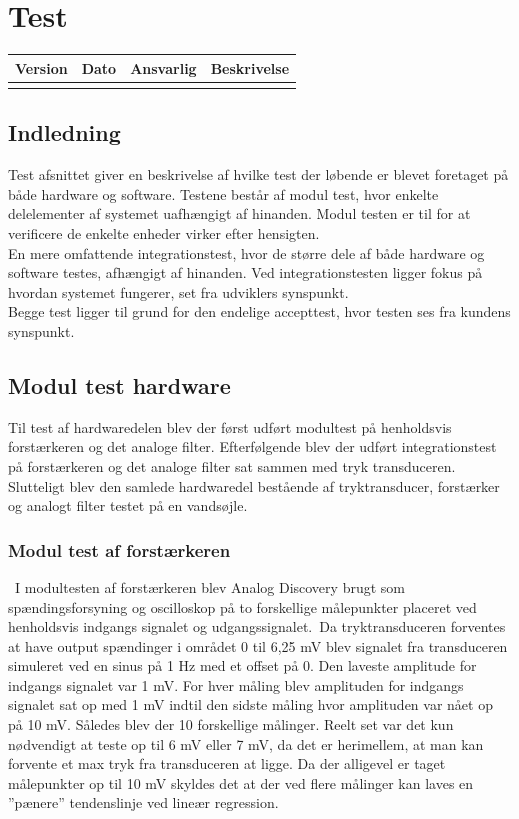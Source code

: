 \chapter{Test}\label{Test}
\setcounter{secnumdepth}{5}

\begin{longtabu} to 
    Version &    Dato &    Ansvarlig &    Beskrivelse\\[-1ex]
    \midrule
\label{version_Systemark}
\end{longtabu}

\section{Indledning}
Test afsnittet giver en beskrivelse af hvilke test der løbende er blevet foretaget på både hardware og software. Testene består af modul test, hvor enkelte delelementer af systemet uafhængigt af hinanden. Modul testen er til for at verificere de enkelte enheder virker efter hensigten.\\
En mere omfattende integrationstest, hvor de større dele af både hardware og software testes, afhængigt af hinanden. Ved integrationstesten ligger fokus på hvordan systemet fungerer, set fra udviklers synspunkt.\\ Begge test ligger til grund for den endelige accepttest, hvor testen ses fra kundens synspunkt.

\section{Modul test hardware}

Til test af hardwaredelen blev der først udført modultest på henholdsvis forstærkeren og det analoge filter. Efterfølgende blev der udført integrationstest på forstærkeren og det analoge filter sat sammen med tryk transduceren. Slutteligt blev den samlede hardwaredel bestående af tryktransducer, forstærker og analogt filter testet på en vandsøjle.\
\subsection{Modul test af forstærkeren}\
I modultesten af forstærkeren blev Analog Discovery brugt som spændingsforsyning og oscilloskop på to forskellige målepunkter placeret ved henholdsvis indgangs signalet og udgangssignalet.\
Da tryktransduceren forventes at have output spændinger i området 0 til 6,25 mV blev signalet fra transduceren simuleret ved en sinus på 1 Hz med et offset på 0. Den laveste amplitude for indgangs signalet var 1 mV. For hver måling blev amplituden for indgangs signalet sat op med 1 mV indtil den sidste måling hvor amplituden var nået op på 10 mV. Således blev der 10 forskellige målinger. Reelt set var det kun nødvendigt at teste op til 6 mV eller 7 mV, da det er herimellem, at man kan forvente et max tryk fra transduceren at ligge. Da der alligevel er taget målepunkter op til 10 mV skyldes det at der ved flere målinger kan laves en ”pænere” tendenslinje ved lineær regression.

